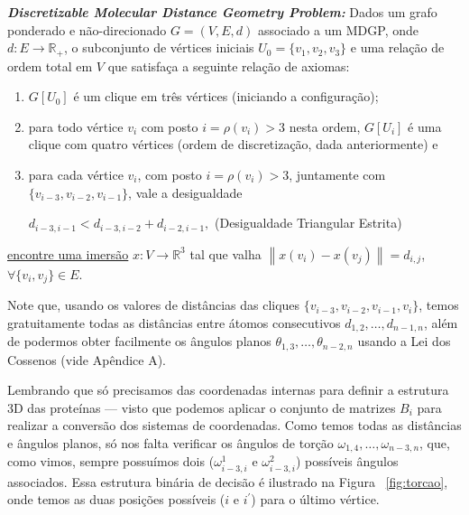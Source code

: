 \documentclass[a4paper,12pt]{article}
\begin{document}
 	\begin{center}
 		\begin{minipage}{0.9 \linewidth}
 			\textbf{\textit{Discretizable Molecular Distance Geometry Problem:}} Dados um grafo ponderado e não-direcionado $G = (V,E,d)$ associado a um MDGP, onde $d: E \longrightarrow \mathbb{R}_{+}$, o subconjunto de vértices iniciais $U_{0} = \{v_{1},v_{2},v_{3} \}$ e uma relação de ordem total em $V$ que satisfaça a seguinte relação de axiomas:
 			\begin{enumerate}
 				\vspace{-0.2cm}
 				\item $G[U_{0}]$ é um clique em três vértices (iniciando a configuração);
 				\vspace{-0.2cm}
 				\item para todo vértice $v_{i}$ com posto $i = \rho(v_{i}) > 3$ nesta ordem, $G[U_{i}]$ é uma clique com quatro vértices (ordem de discretização, dada anteriormente) e
 				\vspace{-0.2cm}
 				\item para cada vértice $v_{i}$, com posto $i = \rho(v_{i}) > 3$, juntamente com $\{ v_{i-3}, v_{i-2} , v_{i-1} \}$, vale a desigualdade
 				\vspace{-0.25cm}
 				\begin{center}
 					$d_{i-3,i-1} < d_{i-3,i-2} + d_{i-2,i-1},$ \hspace{0.5cm} (Desigualdade Triangular Estrita)
 				\end{center}
 			\end{enumerate}
 			\vspace{-0.2cm}
 			\underline{encontre uma imersão} $x: V \longrightarrow \mathbb{R}^{3}$ tal que valha $\left\| x(v_{i}) - x(v_{j}) \right\| = d_{i,j}$, $\forall \{v_{i},v_{j} \} \in E$.
 		\end{minipage}
 	\end{center}
 	
 	Note que, usando os valores de distâncias das cliques $\{ v_{i-3}, v_{i-2} , v_{i-1}, v_i \}$, temos gratuitamente todas as distâncias entre átomos consecutivos $d_{1,2}, \dots, d_{n-1, n}$, além de podermos obter facilmente os ângulos planos $\theta_{1,3}, \dots, \theta_{n-2, n}$ usando a Lei dos Cossenos (vide Apêndice A).
 	
 	Lembrando que só precisamos das coordenadas internas para definir a estrutura 3D das proteínas --- visto que podemos aplicar o conjunto de matrizes $B_i$ para realizar a conversão dos sistemas de coordenadas. Como temos todas as distâncias e ângulos planos, só nos falta verificar os ângulos de torção $\omega_{1,4}, \dots, \omega_{n-3, n}$, que, como vimos, sempre possuímos dois ($\omega_{i-3, i}^1$ e $\omega_{i-3,i}^2$) possíveis ângulos associados. Essa estrutura binária de decisão é ilustrado na Figura ~\ref{fig:torcao}, onde temos as duas posições possíveis ($i$ e $i^\prime$) para o último vértice.
 	
\end{document}
